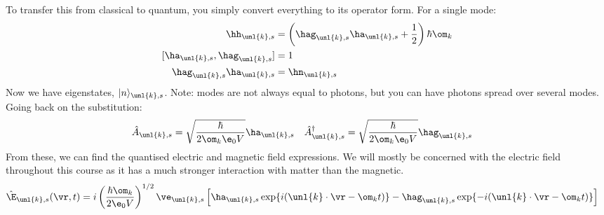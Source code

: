 \documentclass[a4paper, 11pt, normalem]{report}
\begin{document}
To transfer this from classical to quantum, you simply convert everything to its operator form. 
For a single mode:
\begin{align}
    \hh_{\unl{k},s} &= \left(\hag_{\unl{k},s}\ha_{\unl{k},s} + \frac12\right)\hbar\om_k \\
    [\ha_{\unl{k},s},\hag_{\unl{k},s}] &= 1 \\
    \hag_{\unl{k},s}\ha_{\unl{k},s} &= \hn_{\unl{k},s}
\end{align}
Now we have eigenstates, $|n\rangle_{\unl{k},s}$.
Note: modes are not always equal to photons, but you can have photons spread over several modes. \\
Going back on the substitution:
\begin{align}
    \hat{A}_{\unl{k},s} &= \sqrt{\frac{\hbar}{2\om_k\e_0V}}\ha_{\unl{k},s} & \hat{A}_{\unl{k},s}^\dagger &= \sqrt{\frac{\hbar}{2\om_k\e_0V}}\hag_{\unl{k},s}
\end{align}
From these, we can find the quantised electric and magnetic field expressions. 
We will mostly be concerned with the electric field throughout this course as it has a much stronger interaction with matter than the magnetic. 
\begin{align}
    \hat{\E}_{\unl{k},s}(\vr,t) &= i\left(\frac{\hbar\om_k}{2\e_0V}\right)^{1/2}\ve_{\unl{k},s}\left[\ha_{\unl{k},s}\exp\{i(\unl{k}\cdot\vr-\om_kt)\} - \hag_{\unl{k},s}\exp\{-i(\unl{k}\cdot\vr-\om_kt)\}\right]
\end{align}
\end{document}
